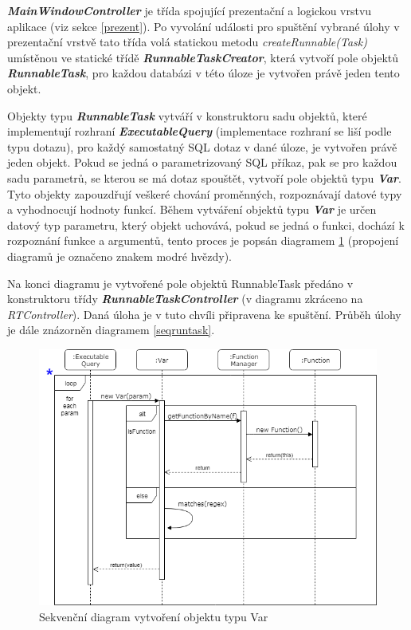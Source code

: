 \documentclass[czech,bachelor,public,dept460,male,cpdeclaration,twoside]{diploma}
\begin{document}
\textbf{\emph{MainWindowController}} je třída spojující prezentační a logickou vrstvu aplikace (viz sekce \ref{prezent}). Po vyvolání události pro spuštění vybrané úlohy v prezentační vrstvě tato třída volá statickou metodu \textit{createRunnable(Task)} umístěnou ve statické třídě \textbf{\emph{RunnableTaskCreator}}, která vytvoří pole objektů \textbf{\emph{RunnableTask}}, pro každou databázi v této úloze je vytvořen právě jeden tento objekt.

Objekty typu \textbf{\emph{RunnableTask}} vytváří v konstruktoru sadu objektů, které implementují rozhraní \textbf{\emph{ExecutableQuery}} (implementace rozhraní se liší podle typu dotazu), pro každý samostatný SQL dotaz v dané úloze, je vytvořen právě jeden objekt. Pokud se jedná o parametrizovaný SQL příkaz, pak se pro každou sadu parametrů, se kterou se má dotaz spouštět, vytvoří pole objektů typu \textbf{\emph{Var}}. Tyto objekty zapouzdřují veškeré chování proměnných, rozpoznávají datové typy a vyhodnocují hodnoty funkcí. Během vytváření objektů typu \textbf{\emph{Var}} je určen datový typ parametru, který objekt uchovává, pokud se jedná o funkci, dochází k rozpoznání funkce a argumentů, tento proces je popsán diagramem \ref{seqvar} (propojení diagramů je označeno znakem modré hvězdy).


Na konci diagramu je vytvořené pole objektů RunnableTask předáno v konstruktoru třídy  \textbf{\emph{RunnableTaskController}} (v diagramu zkráceno na \textit{RTController}). Daná úloha je v tuto chvíli připravena ke spuštění. Průběh úlohy je dále znázorněn diagramem \ref{seqruntask}.


\begin{figure}[!htbp]\centering\includegraphics[width=1.0\textwidth]{Figures/var.png}\caption{Sekvenční diagram vytvoření objektu typu Var}
\label{seqvar}
\end{figure}
\end{document}

